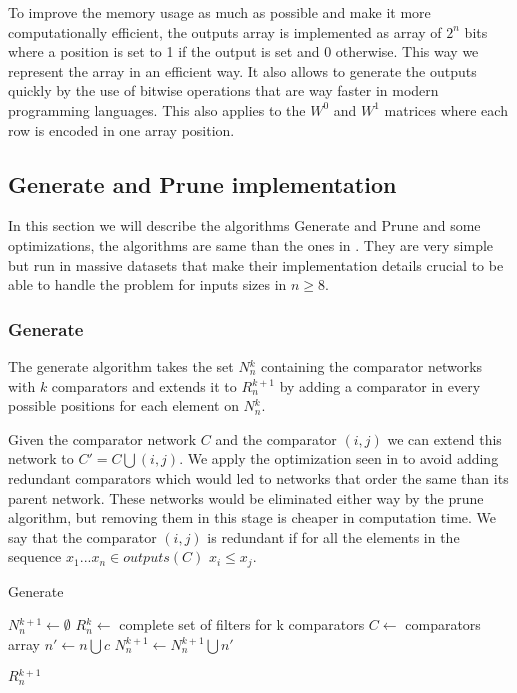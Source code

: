\documentclass[../main.tex]{subfiles}
\begin{document}
	To improve the memory usage as much as possible and make it more computationally efficient, the outputs array is implemented as array of $2^n$ bits where a position is set to 1 if the output is set and 0 otherwise. This way we represent the array in an efficient way. It also allows to generate the outputs quickly by the use of bitwise operations that are way faster in modern programming languages. This also applies to the $W^0$ and $W^1$ matrices where each row is encoded in one array position.
	
	\subsection{Generate and Prune implementation}
	In this section we will describe the algorithms Generate and Prune and some optimizations, the algorithms are same than the ones in \cite{sortingnineinputs}. They are very simple but run in massive datasets that make their implementation details crucial to be able to handle the problem for inputs sizes in $n \geq 8$.
	
	\subsubsection{Generate}
	The generate algorithm takes the set $N{_n^k}$ containing the comparator networks with $k$ comparators and extends it to $R{_n^{k+1}}$ by adding a comparator in every possible positions for each element on $N{_n^k}$.
	
	Given the comparator network $C$ and the comparator $(i,j)$ we can extend this network to $C' = C \bigcup (i,j)$. We apply the optimization seen in \cite{sortingnineinputs} to avoid adding redundant comparators which would led to networks that order the same than its parent network. These networks would be eliminated either way by the prune algorithm, but removing them in this stage is cheaper in computation time. We say that the comparator $(i,j)$ is redundant if for all the elements in the sequence $x_1...x_n  \in outputs(C)$ $x_i \leq x_j$.
	
	\begin{algorithm}[H]
		\caption{Generate} 
		\begin{algorithmic}
			\State $N{_n^{k+1}} \leftarrow \emptyset$
			\State $R{_n^k} \leftarrow$ complete set of filters for k comparators
			\State $C \leftarrow$ comparators array
			\State $n' \leftarrow n\bigcup c$
			\State $N{_n^{k+1}} \leftarrow N{_n^{k+1}} \bigcup n'$
			\EndIf
			\EndFor
			\EndFor
			
			\Return $R{_n^{k+1}}$
		\end{algorithmic}
	\end{algorithm}
	
\end{document}
